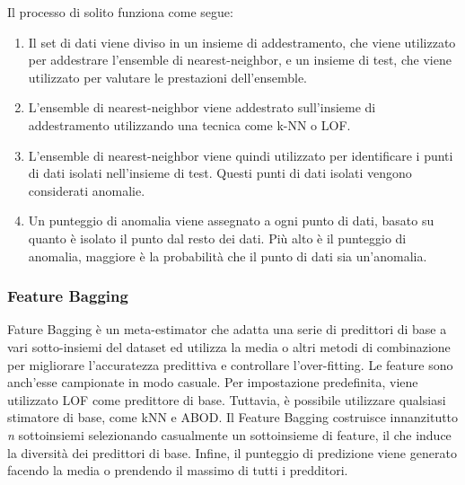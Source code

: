 Il processo di solito funziona come segue:
\begin{enumerate}
\item Il set di dati viene diviso in un insieme di addestramento, che viene utilizzato per addestrare l'ensemble di nearest-neighbor, e un insieme di test, che viene utilizzato per valutare le prestazioni dell'ensemble.
\item L'ensemble di nearest-neighbor viene addestrato sull'insieme di addestramento utilizzando una tecnica come k-NN o LOF.
\item L'ensemble di nearest-neighbor viene quindi utilizzato per identificare i punti di dati isolati nell'insieme di test. Questi punti di dati isolati vengono considerati anomalie.
\item Un punteggio di anomalia viene assegnato a ogni punto di dati, basato su quanto è isolato il punto dal resto dei dati. Più alto è il punteggio di anomalia, maggiore è la probabilità che il punto di dati sia un'anomalia.
\end{enumerate}

\subsubsection{Feature Bagging}
Fature Bagging è un meta-estimator che adatta una serie di predittori di base a vari sotto-insiemi del dataset ed utilizza la media o altri metodi di combinazione per migliorare l'accuratezza predittiva e controllare l'over-fitting.
Le feature sono anch'esse campionate in modo casuale.
Per impostazione predefinita, viene utilizzato LOF come predittore di base. Tuttavia, è possibile utilizzare qualsiasi stimatore di base, come kNN e ABOD.
Il Feature Bagging costruisce innanzitutto \textit{n} sottoinsiemi selezionando casualmente un sottoinsieme di feature, il che induce la diversità dei predittori di base.
Infine, il punteggio di predizione viene generato facendo la media o prendendo il massimo di tutti i predditori.

